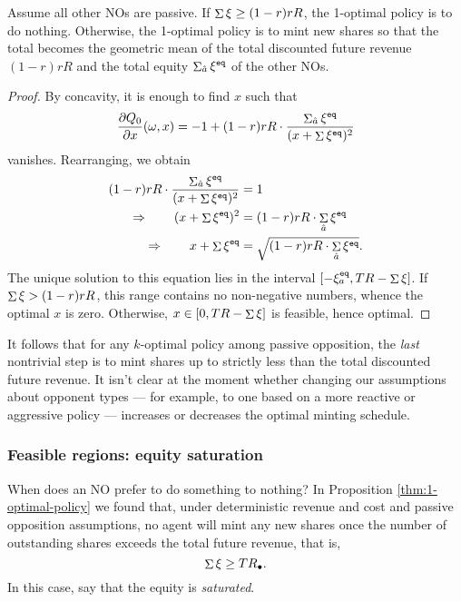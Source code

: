 \begin{proposition}
  \label{thm:1-optimal-policy}

  Assume all other NOs are passive.
  If $\mathop{\Sigma}\xi\geq (1-r)rR$, the 1-optimal policy is to do nothing.
  Otherwise, the 1-optimal policy is to mint new shares so that the total becomes the geometric mean of the total discounted future revenue $(1-r)rR$ and the total equity $\mathop{\Sigma}_{\hat{a}} \xi^{\mathtt{eq}}$ of the other NOs.

\end{proposition}
%
\begin{proof}

  By concavity, it is enough to find $x$ such that 
  \[
    \frac{\partial Q_0}{\partial x}(\omega,x) = -1 + (1-r) rR \cdot\frac{\mathop{\Sigma}_{\hat{a}} \xi^{\mathtt{eq}}}{(x+\mathop{\Sigma} \xi^{\mathtt{eq}})^2}
  \]
  vanishes.
  Rearranging, we obtain
  \begin{align*}
     (1-r)rR\cdot\frac{\mathop{\Sigma}_{\hat{a}} \xi^{\mathtt{eq}}}{(x + \mathop{\Sigma} \xi^{\mathtt{eq}})^2} &= 1 \\
    \Rightarrow\qquad (x + \mathop{\Sigma} \xi^{\mathtt{eq}})^2 &= (1-r)rR \cdot \mathop{\Sigma}_{\hat{a}} \xi^{\mathtt{eq}} \\
    \Rightarrow\qquad x + \mathop{\Sigma} \xi^{\mathtt{eq}} &= \sqrt{ (1-r)rR\cdot \mathop{\Sigma}_{\hat{a}} \xi^{\mathtt{eq}} }.
  \end{align*}
  The unique solution to this equation lies in the interval $[-\xi_a^{\mathtt{eq}},TR-\mathop{\Sigma}\xi]$.
  If $\mathop{\Sigma}\xi > (1-r)rR$, this range contains no non-negative numbers, whence the optimal $x$ is zero.
  Otherwise, $x\in [0,TR-\mathop{\Sigma}\xi]$ is feasible, hence optimal. \qedhere

\end{proof}

It follows that for any $k$-optimal policy among passive opposition, the \emph{last} nontrivial step is to mint shares up to strictly less than the total discounted future revenue.
%
It isn't clear at the moment whether changing our assumptions about opponent types --- for example, to one based on a more reactive or aggressive policy --- increases or decreases the optimal minting schedule.



\subsubsection{Feasible regions: equity saturation}
\label{section:saturation}

When does an NO prefer to do something to nothing?
%
In Proposition \ref{thm:1-optimal-policy} we found that, under deterministic revenue and cost and passive opposition assumptions, no agent will mint any new shares once the number of outstanding shares exceeds the total future revenue, that is,
\[
  \mathop{\Sigma}\xi \geq TR_\bullet.
\]
%
In this case, say that the equity is \emph{saturated}.

